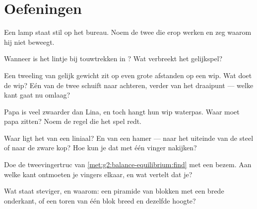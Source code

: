 \section{Oefeningen}

\begin{exercise}[$\star$]\label{exo:g2:balance-equilibrium:1}
Een lamp staat stil op het bureau. Noem de twee  die erop
werken en zeg waarom hij niet beweegt.
\end{exercise}

\begin{exercise}[$\star$]\label{exo:g2:balance-equilibrium:2}
Wanneer is het lintje bij touwtrekken in ? Wat verbreekt het
gelijkspel?
\end{exercise}

\begin{exercise}[$\star$]\label{exo:g2:balance-equilibrium:3}
Een tweeling van gelijk gewicht zit op even grote afstanden op een
wip. Wat doet de wip? Eén van de twee schuift naar achteren, verder
van het draaipunt --- welke kant gaat nu omlaag?
\end{exercise}

\begin{exercise}[$\star$]\label{exo:g2:balance-equilibrium:4}
Papa is veel zwaarder dan Lina, en toch hangt hun wip waterpas. Waar
moet papa zitten? Noem de regel die het spel redt.
\end{exercise}

\begin{exercise}[$\star$]\label{exo:g2:balance-equilibrium:5}
Waar ligt het  van een liniaal? En van een hamer --- naar
het uiteinde van de steel of naar de zware kop? Hoe kun je dat met
één vinger nakijken?
\end{exercise}

\begin{exercise}[$\star$]\label{exo:g2:balance-equilibrium:6}
Doe de tweevingertruc van \cref{met:g2:balance-equilibrium:find} met
een bezem. Aan welke kant ontmoeten je vingers elkaar, en wat vertelt
dat je?
\end{exercise}

\begin{exercise}[$\star$]\label{exo:g2:balance-equilibrium:7}
Wat staat steviger, en waarom: een piramide van blokken met een brede
onderkant, of een toren van één blok breed en dezelfde hoogte?
\end{exercise}

